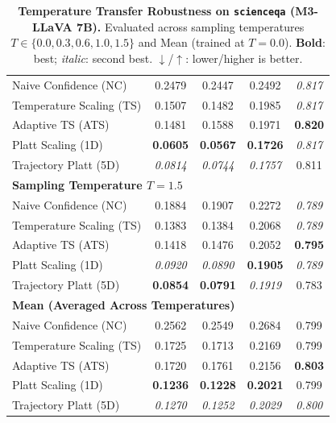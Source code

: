 \begin{table}[t]
{\begin{tabular}{lcccc}
\midrule
Naive Confidence (NC) & 0.2479 & 0.2447 & 0.2492 & \textit{0.817} \\
Temperature Scaling (TS) & 0.1507 & 0.1482 & 0.1985 & \textit{0.817} \\
Adaptive TS (ATS) & 0.1481 & 0.1588 & 0.1971 & \textbf{0.820} \\
Platt Scaling (1D) & \textbf{0.0605} & \textbf{0.0567} & \textbf{0.1726} & \textit{0.817} \\
Trajectory Platt (5D) & \textit{0.0814} & \textit{0.0744} & \textit{0.1757} & 0.811 \\
\midrule
\multicolumn{5}{l}{\textbf{Sampling Temperature $T = 1.5$}} \\
\midrule
Naive Confidence (NC) & 0.1884 & 0.1907 & 0.2272 & \textit{0.789} \\
Temperature Scaling (TS) & 0.1383 & 0.1384 & 0.2068 & \textit{0.789} \\
Adaptive TS (ATS) & 0.1418 & 0.1476 & 0.2052 & \textbf{0.795} \\
Platt Scaling (1D) & \textit{0.0920} & \textit{0.0890} & \textbf{0.1905} & \textit{0.789} \\
Trajectory Platt (5D) & \textbf{0.0854} & \textbf{0.0791} & \textit{0.1919} & 0.783 \\
\midrule
\multicolumn{5}{l}{\textbf{Mean (Averaged Across Temperatures)}} \\
\midrule
Naive Confidence (NC) & 0.2562 & 0.2549 & 0.2684 & 0.799 \\
Temperature Scaling (TS) & 0.1725 & 0.1713 & 0.2169 & 0.799 \\
Adaptive TS (ATS) & 0.1720 & 0.1761 & 0.2156 & \textbf{0.803} \\
Platt Scaling (1D) & \textbf{0.1236} & \textbf{0.1228} & \textbf{0.2021} & 0.799 \\
Trajectory Platt (5D) & \textit{0.1270} & \textit{0.1252} & \textit{0.2029} & \textit{0.800} \\
\bottomrule
\end{tabular}%
}
\caption{\textbf{Temperature Transfer Robustness on \texttt{scienceqa} (M3-LLaVA 7B).} Evaluated across sampling temperatures $T \in \{0.0, 0.3, 0.6, 1.0, 1.5\}$ and Mean (trained at $T=0.0$). \textbf{Bold}: best; \textit{italic}: second best. $\downarrow$/$\uparrow$: lower/higher is better.}
\label{tab:temp_transfer_m3_scienceqa}
\end{table}

